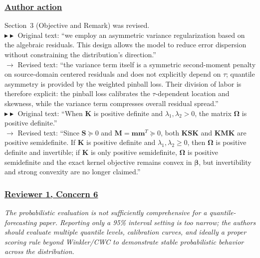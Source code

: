 \documentclass[journal,12pn, onecolumn]{IEEEtran}
\begin{document}
{{{{{{{{{{{{{\color{black}
\subsubsection*{\textbf{\underline{Author action}}}
Section~3 (Objective and Remark) was revised.\\
$\blacktriangleright\blacktriangleright$ Original text: ``we employ an asymmetric variance regularization based on the algebraic residuals. This design allows the model to reduce error dispersion without constraining the distribution's direction.''\\
$\longrightarrow$ Revised text: ``{\color{blue}the variance term itself is a symmetric second-moment penalty on source-domain centered residuals and does not explicitly depend on $\tau$; quantile asymmetry is provided by the weighted pinball loss. Their division of labor is therefore explicit: the pinball loss calibrates the $\tau$-dependent location and skewness, while the variance term compresses overall residual spread.}''\\
$\blacktriangleright\blacktriangleright$ Original text: ``When $\boldsymbol{K}$ is positive definite and $\lambda_1, \lambda_2 > 0$, the matrix $\boldsymbol{\Omega}$ is positive definite.''\\
$\longrightarrow$ Revised text: ``{\color{blue}Since $\mathbf{S}\succeq 0$ and $\mathbf{M}=\mathbf{m}\mathbf{m}^T\succeq 0$, both $\boldsymbol{K}\mathbf{S}\boldsymbol{K}$ and $\boldsymbol{K}\mathbf{M}\boldsymbol{K}$ are positive semidefinite. If $\boldsymbol{K}$ is positive definite and $\lambda_1,\lambda_2\ge 0$, then $\boldsymbol{\Omega}$ is positive definite and invertible; if $\boldsymbol{K}$ is only positive semidefinite, $\boldsymbol{\Omega}$ is positive semidefinite and the exact kernel objective remains convex in $\boldsymbol{\beta}$, but invertibility and strong convexity are no longer claimed.}''}

\textcolor{customgreen}{
\subsubsection*{\underline{\textbf{Reviewer 1, Concern 6}}}
\emph{The probabilistic evaluation is not sufficiently comprehensive for a quantile-forecasting paper. Reporting only a 95\% interval setting is too narrow; the authors should evaluate multiple quantile levels, calibration curves, and ideally a proper scoring rule beyond Winkler/CWC to demonstrate stable probabilistic behavior across the distribution.}
}\\

}}}}}}}}}}}}
\end{document}
